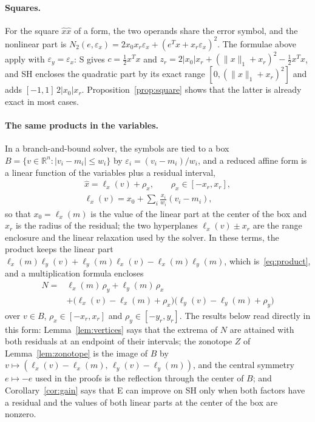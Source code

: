 \documentclass[10pt]{article}
\theoremstyle{definition}
\newcommand{\R}{\mathbb{R}}
\newcommand{\eps}{\varepsilon}
\newcommand{\ex}{\eps_x}
\newcommand{\ey}{\eps_y}
\begin{document}
\paragraph{Squares.} For the square $\hat x\hat x$ of a form, the two operands share the error symbol, and the nonlinear part is $N_2(e,\ex)=2x_0x_r\ex+(e^Tx+x_r\ex)^2$. The formulae above apply with $\ey=\ex$: S gives $c=\tfrac12x^Tx$ and $z_r=2|x_0|x_r+(\|x\|_1+x_r)^2-\tfrac12x^Tx$, and SH encloses the quadratic part by its exact range $[0,(\|x\|_1+x_r)^2]$ and adds $[-1,1]\,2|x_0|x_r$. Proposition~\ref{prop:square} shows that the latter is already exact in most cases.

\paragraph{The same products in the variables.} In a branch-and-bound solver, the symbols are tied to a box $B=\{v\in\R^n: |v_i-m_i|\le w_i\}$ by $\eps_i=(v_i-m_i)/w_i$, and a reduced affine form is a linear function of the variables plus a residual interval,
\[
\begin{gathered}\hat x = \ell_x(v)+\rho_x,\qquad \rho_x\in[-x_r,x_r],\\ \ell_x(v)=x_0+\sum_i\frac{x_i}{w_i}(v_i-m_i),\end{gathered}
\]
so that $x_0=\ell_x(m)$ is the value of the linear part at the center of the box and $x_r$ is the radius of the residual; the two hyperplanes $\ell_x(v)\pm x_r$ are the range enclosure and the linear relaxation used by the solver. In these terms, the product keeps the linear part $\ell_x(m)\ell_y(v)+\ell_y(m)\ell_x(v)-\ell_x(m)\ell_y(m)$, which is~\eqref{eq:product}, and a multiplication formula encloses
\[
\begin{aligned}N={}&\ell_x(m)\,\rho_y+\ell_y(m)\,\rho_x\\&+\big(\ell_x(v)-\ell_x(m)+\rho_x\big)\big(\ell_y(v)-\ell_y(m)+\rho_y\big)\end{aligned}
\]
over $v\in B$, $\rho_x\in[-x_r,x_r]$ and $\rho_y\in[-y_r,y_r]$. The results below read directly in this form: Lemma~\ref{lem:vertices} says that the extrema of $N$ are attained with both residuals at an endpoint of their intervals; the zonotope $Z$ of Lemma~\ref{lem:zonotope} is the image of $B$ by $v\mapsto(\ell_x(v)-\ell_x(m),\,\ell_y(v)-\ell_y(m))$, and the central symmetry $e\mapsto-e$ used in the proofs is the reflection through the center of $B$; and Corollary~\ref{cor:gain} says that E can improve on SH only when both factors have a residual and the values of both linear parts at the center of the box are nonzero.
\end{document}
